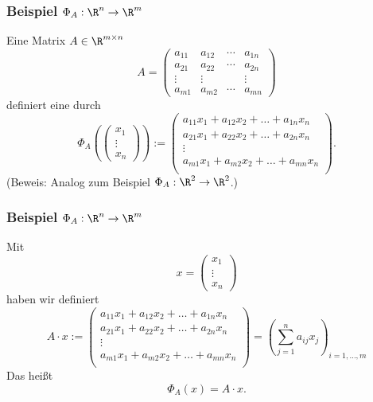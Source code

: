 %
%
%
%
%
%
\begin{frame}\frametitle{Beispiel $\Phi_A: \R^n \to \R^m$}

	Eine Matrix $A\in \R^{m\times n}$ 
	$$
		A = 
		\begin{pmatrix}
			a_{11}	&a_{12}	&\cdots	&a_{1n}\\
			a_{21} 	&a_{22} 	&\cdots 	&a_{2n}\\
			\vdots 	& \vdots   	&            	& \vdots \\
			a_{m1} 	&a_{m2}	&\cdots 	&a_{mn}
		\end{pmatrix}
	$$
	definiert eine  durch
	$$
		\Phi_A
		\left(
			\begin{pmatrix}
				x_1\\
				\vdots\\
				x_n
			\end{pmatrix}
	     	\right) 
	      :=
		\begin{pmatrix}
			a_{11}x_1 + a_{12}x_2 + \ldots + a_{1n}x_n \\
			a_{21}x_1 + a_{22}x_2 + \ldots + a_{2n}x_n \\
			\vdots				\\
			a_{m1}x_1 + a_{m2}x_2 + \ldots + a_{mn}x_n\\
		\end{pmatrix}.
	$$
	(Beweis: Analog zum Beispiel $\Phi_A: \R^2\to \R^2$.)
	
\end{frame}
%
%
\begin{frame}\frametitle{Beispiel $\Phi_A: \R^n \to \R^m$}
	
	Mit 
	$$
		x 
		=
		\begin{pmatrix}
			x_1\\
			\vdots\\
			x_n
		\end{pmatrix}
	$$
	haben wir definiert
	$$
		A\cdot x 
		:=
		\begin{pmatrix}
			a_{11}x_1 + a_{12}x_2 + \ldots + a_{1n}x_n \\
			a_{21}x_1 + a_{22}x_2 + \ldots + a_{2n}x_n \\
			\vdots				\\
			a_{m1}x_1 + a_{m2}x_2 + \ldots + a_{mn}x_n\\
		\end{pmatrix}
		=
		\left(
			\sum_{j=1}^na_{ij}x_j
		\right)_{i=1,\ldots, m}	
	$$
	Das hei{\ss}t
	$$
		\Phi_A(x) = A\cdot x.
	$$
	
\end{frame}
%
%

